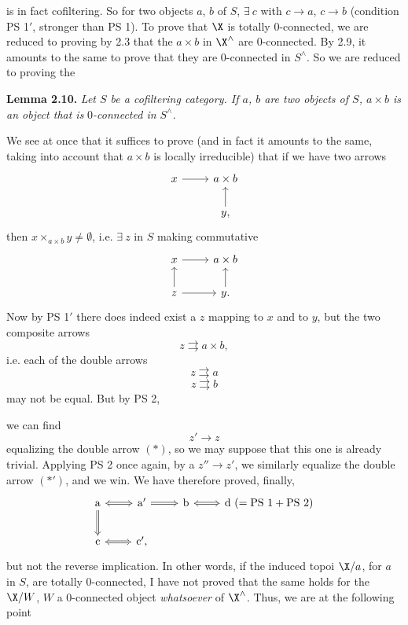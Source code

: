  is in fact cofiltering. So for two objects $a$, $b$ of $S$, $\exists\ c$ with $c\longrightarrow a$, $c\longrightarrow b$ (condition PS 1$'$, stronger than PS 1). To prove that $\X$ is totally 0-connected, we are reduced to proving by 2.3 that the $a\times b$ in $\X^\wedge$ are 0-connected. By 2.9, it amounts to the same to prove that they are 0-connected in $S^\wedge$. So we are reduced to proving the

\textbf{Lemma 2.10.} \textit{Let $S$ be a cofiltering category. If $a$, $b$ are two objects of $S$, $a\times b$ is an object that is} $0$\textit{-connected in $S^\wedge$.}

We see at once that it suffices to prove (and in fact it amounts to the same, taking into account that $a\times b$ is locally irreducible) that if we have two arrows
\[
\begin{tikzcd}
x \arrow[r] & a\times b \\
 & y, \arrow[u]
\end{tikzcd}
\]
then $x\times_{a\times b}y\neq\emptyset$, i.e. $\exists\ z$ in $S$ making commutative
\[
\begin{tikzcd}
x \arrow[r] & a\times b \\
z \arrow[u] \arrow[r] & y. \arrow[u]
\end{tikzcd}
\]
Now by PS 1$'$ there does indeed exist a $z$ mapping to $x$ and to $y$, but the two composite arrows
\[
z\rightrightarrows a\times b,
\]
i.e. each of the double arrows
\[
z\rightrightarrows a \tag*{$(*)$}
\]
\[
z\rightrightarrows b \tag*{$(*')$}
\]
may not be equal. But by PS 2,

we can find
\[
z'\longrightarrow z
\]
equalizing the double arrow $(*)$, so we may suppose that this one is already trivial. Applying PS 2 once again, by a $z''\longrightarrow z'$, we similarly equalize the double arrow $(*')$, and we win. We have therefore proved, finally,
\[
\begin{tikzcd}
\mathrm{a} \arrow[r, Leftrightarrow] \arrow[d, Rightarrow] & \mathrm{a}' \arrow[r, Rightarrow] & \mathrm{b} \arrow[r, Leftrightarrow] & \mathrm{d}\ (=\mathrm{PS}\ 1+\mathrm{PS}\ 2) \\
\mathrm{c} \arrow[r, Leftrightarrow] & \mathrm{c}',
\end{tikzcd}
\]
but not the reverse implication. In other words, if the induced topoi $\X/a$, for $a$ in $S$, are totally 0-connected, I have not proved that the same holds for the $\X/W$, $W$ a 0-connected object \textit{whatsoever} of $\X^\wedge$. Thus, we are at the following point

